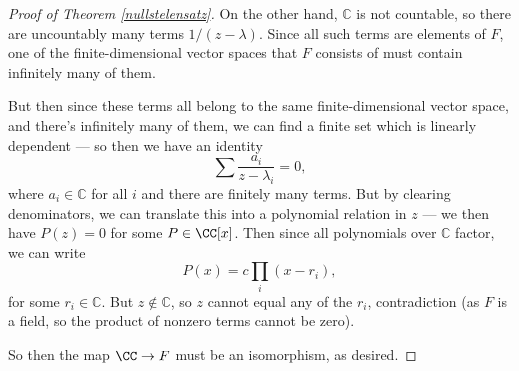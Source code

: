 \begin{proof}[Proof of Theorem \ref{nullstelensatz}]
On the other hand, $\mathbb{C}$ is not countable, so there are uncountably many terms $1/(z - \lambda)$. Since all such terms are elements of $F$, one of the finite-dimensional vector spaces that $F$ consists of must contain infinitely many of them. 

But then since these terms all belong to the same finite-dimensional vector space, and there's infinitely many of them, we can find a finite set which is linearly dependent --- so then we have an identity \[\sum \frac{a_i}{z - \lambda_i} = 0,\] where $a_i \in \mathbb{C}$ for all $i$ and there are finitely many terms. But by clearing denominators, we can translate this into a polynomial relation in $z$ --- we then have $P(z) = 0$ for some $P \in \CC[x]$. Then since all polynomials over $\mathbb{C}$ factor, we can write \[P(x) = c\prod_i (x - r_i),\] for some $r_i \in \mathbb{C}$. But $z \not\in \mathbb{C}$, so $z$ cannot equal any of the $r_i$, contradiction (as $F$ is a field, so the product of nonzero terms cannot be zero). 
    
So then the map $\CC \to F$ must be an isomorphism, as desired. 
\end{proof}




